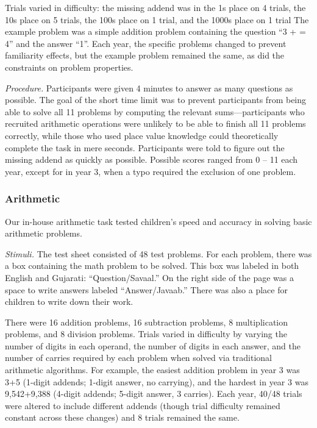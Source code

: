 \documentclass[11pt]{article}
\begin{document}
Trials varied in difficulty: the missing addend was in the 1s place on 4 trials, the 10s place on 5 trials, the 100s place on 1 trial, and the 1000s place on 1 trial The example problem was a simple addition problem containing the question ``3 + \underline{\hspace{1cm}} = 4'' and the answer ``1''. Each year, the specific problems changed to prevent familiarity effects, but the example problem remained the same, as did the constraints on problem properties. 

{\it Procedure.} Participants were given 4 minutes to answer as many questions as possible. The goal of the short time limit was to prevent participants from being able to solve all 11 problems by computing the relevant sums---participants who recruited arithmetic operations were unlikely to be able to finish all 11 problems correctly, while those who used place value knowledge could theoretically complete the task in mere seconds. Participants were told to figure out the missing addend as quickly as possible. Possible scores ranged from 0 -- 11 each year, except for in year 3, when a typo required the exclusion of one problem.

\subsubsection{Arithmetic} 

Our in-house arithmetic task tested children's speed and accuracy in solving basic arithmetic problems.

{\it Stimuli.} The test sheet consisted of 48 test problems. For each problem, there was a box containing the math problem to be solved. This box was labeled in both English and Gujarati: ``Question/Savaal.'' On the right side of the page was a space to write answers labeled ``Answer/Javaab.'' There was also a place for children to write down their work. 

There were 16 addition problems, 16 subtraction problems, 8 multiplication problems, and 8 division problems. Trials varied in difficulty by varying the number of digits in each operand, the number of digits in each answer, and the number of carries required by each problem when solved via traditional arithmetic algorithms. For example, the easiest addition problem in year 3 was 3+5 (1-digit addends; 1-digit answer, no carrying), and the hardest in year 3 was 9,542+9,388 (4-digit addends; 5-digit answer, 3 carries). Each year, 40/48 trials were altered to include different addends (though trial difficulty remained constant across these changes) and 8 trials remained the same. 
\end{document}
